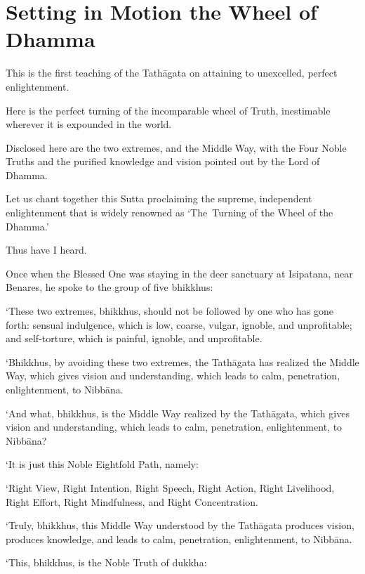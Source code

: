 \section{Setting in Motion the Wheel of Dhamma}

\begin{leader}

This is the first teaching of the Tathāgata on attaining to unexcelled,
perfect enlightenment.

Here is the perfect turning of the incomparable wheel of Truth,
inestimable wherever it is expounded in the world.

Disclosed here are the two extremes, and the Middle Way, with the Four Noble
Truths and the purified knowledge and vision pointed out by the Lord of
Dhamma.

Let us chant together this Sutta proclaiming the supreme, independent
enlightenment that is widely renowned as ‘The~Turning of the Wheel of
the Dhamma.’

\end{leader}

Thus have I heard.

Once when the Blessed One was staying in the deer sanctuary at
Isipatana, near Benares, he spoke to the group of five bhikkhus:

‘These two extremes, bhikkhus, should not be followed by one who has
gone forth: sensual indulgence, which is low, coarse, vulgar, ignoble,
and unprofitable; and self-torture, which is painful, ignoble, and
unprofitable.

‘Bhikkhus, by avoiding these two extremes, the Tathāgata has realized
the Middle Way, which gives vision and understanding, which leads to
calm, penetration, enlightenment, to Nibbāna.

‘And what, bhikkhus, is the Middle Way realized by the Tathāgata, which
gives vision and understanding, which leads to calm, penetration,
enlightenment, to Nibbāna?

‘It is just this Noble Eightfold Path, namely:

‘Right View, Right Intention, Right Speech, Right Action, Right
Livelihood, Right Effort, Right Mindfulness, and Right Concentration.

‘Truly, bhikkhus, this Middle Way understood by the Tathāgata produces
vision, produces knowledge, and leads to calm, penetration,
enlightenment, to Nibbāna.

‘This, bhikkhus, is the Noble Truth of dukkha:

